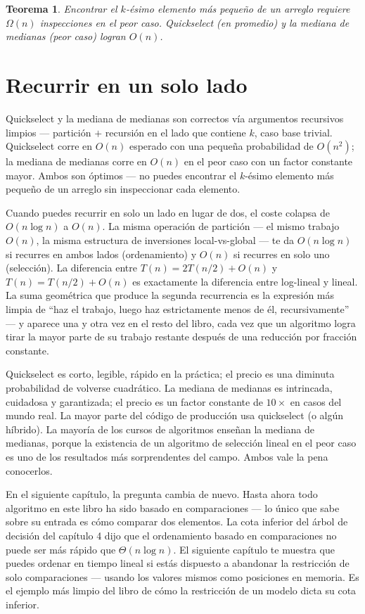 \documentclass[11pt,a4paper]{article}
\newtheorem{teorema}{Teorema}
\begin{document}
\begin{teorema}
Encontrar el $k$-ésimo elemento más pequeño de un arreglo requiere $\Omega(n)$ inspecciones en el peor caso. Quickselect (en promedio) y la mediana de medianas (peor caso) logran $O(n)$.
\end{teorema}

\section{Recurrir en un solo lado}

Quickselect y la mediana de medianas son correctos vía argumentos recursivos limpios --- partición $+$ recursión en el lado que contiene $k$, caso base trivial. Quickselect corre en $O(n)$ esperado con una pequeña probabilidad de $O(n^2)$; la mediana de medianas corre en $O(n)$ en el peor caso con un factor constante mayor. Ambos son óptimos --- no puedes encontrar el $k$-ésimo elemento más pequeño de un arreglo sin inspeccionar cada elemento.

Cuando puedes recurrir en solo un lado en lugar de dos, el coste colapsa de $O(n \log n)$ a $O(n)$. La misma operación de partición --- el mismo trabajo $O(n)$, la misma estructura de inversiones local-vs-global --- te da $O(n \log n)$ si recurres en ambos lados (ordenamiento) y $O(n)$ si recurres en solo uno (selección). La diferencia entre $T(n) = 2T(n/2) + O(n)$ y $T(n) = T(n/2) + O(n)$ es exactamente la diferencia entre log-lineal y lineal. La suma geométrica que produce la segunda recurrencia es la expresión más limpia de ``haz el trabajo, luego haz estrictamente menos de él, recursivamente'' --- y aparece una y otra vez en el resto del libro, cada vez que un algoritmo logra tirar la mayor parte de su trabajo restante después de una reducción por fracción constante.

Quickselect es corto, legible, rápido en la práctica; el precio es una diminuta probabilidad de volverse cuadrático. La mediana de medianas es intrincada, cuidadosa y garantizada; el precio es un factor constante de $10\times$ en casos del mundo real. La mayor parte del código de producción usa quickselect (o algún híbrido). La mayoría de los cursos de algoritmos enseñan la mediana de medianas, porque la existencia de un algoritmo de selección lineal en el peor caso es uno de los resultados más sorprendentes del campo. Ambos vale la pena conocerlos.

En el siguiente capítulo, la pregunta cambia de nuevo. Hasta ahora todo algoritmo en este libro ha sido basado en comparaciones --- lo único que sabe sobre su entrada es cómo comparar dos elementos. La cota inferior del árbol de decisión del capítulo 4 dijo que el ordenamiento basado en comparaciones no puede ser más rápido que $\Theta(n \log n)$. El siguiente capítulo te muestra que puedes ordenar en tiempo lineal si estás dispuesto a abandonar la restricción de solo comparaciones --- usando los valores mismos como posiciones en memoria. Es el ejemplo más limpio del libro de cómo la restricción de un modelo dicta su cota inferior.
\end{document}
